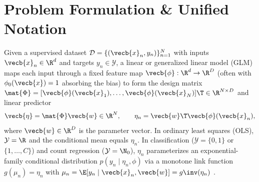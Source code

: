 \documentclass[../../../../master.tex]{subfiles}
\begin{document}

\section{Problem Formulation \& Unified Notation}
\label{sec:glm:formulation}

Given a supervised dataset $\mathcal{D} = \{(\vecb{x}_n, y_n)\}_{n=1}^N$ with inputs $\vecb{x}_n \in \R^d$ and targets $y_n \in \mathcal{Y}$, a linear or generalized linear model (GLM) maps each input through a fixed feature map $\vecb{\phi}: \R^d \to \R^D$ (often with $\phi_0(\vecb{x}) = 1$ absorbing the bias) to form the design matrix $\mat{\Phi} = [\vecb{\phi}(\vecb{x}_1), \dots, \vecb{\phi}(\vecb{x}_N)]\T \in \R^{N \times D}$ and linear predictor
\begin{equation}
\label{eq:glm:linear_predictor}
\vecb{\eta} = \mat{\Phi}\vecb{w} \in \R^N, \qquad \eta_n = \vecb{w}\T \vecb{\phi}(\vecb{x}_n),
\end{equation}
where $\vecb{w} \in \R^D$ is the parameter vector. In ordinary least squares (OLS), $\mathcal{Y} = \R$ and the conditional mean equals $\eta_n$. In classification ($\mathcal{Y} = \{0,1\}$ or $\{1,\dots,C\}$) and count regression ($\mathcal{Y} = \N_0$), $\eta_n$ parameterizes an exponential-family conditional distribution $p(y_n \mid \eta_n, \phi)$ via a monotone link function $g(\mu_n) = \eta_n$ with $\mu_n = \E[y_n \mid \vecb{x}_n, \vecb{w}] = g\inv(\eta_n)$ .
\end{document}
